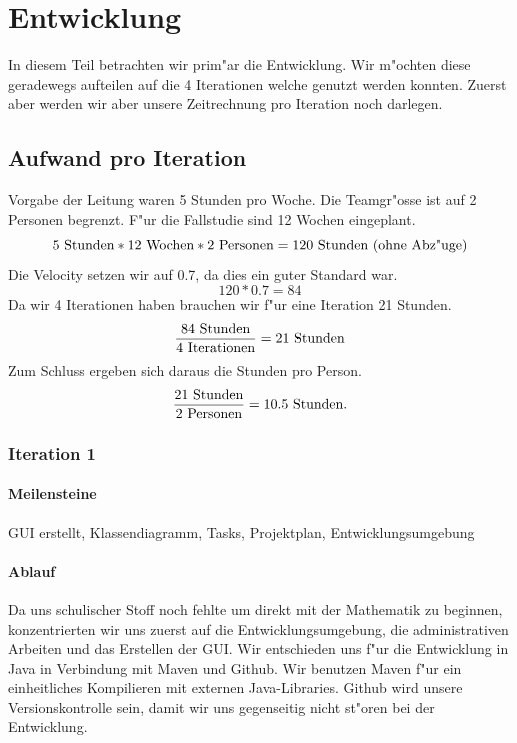 \documentclass[11pt]{report}
\begin{document}
\newpage

\chapter{Entwicklung}
In diesem Teil betrachten wir prim"ar die Entwicklung. Wir m"ochten diese geradewegs aufteilen auf die 4 Iterationen welche genutzt werden konnten. Zuerst aber werden wir aber unsere Zeitrechnung pro Iteration noch darlegen.
\section{Aufwand pro Iteration}
Vorgabe der Leitung waren 5 Stunden pro Woche. Die Teamgr"osse ist auf 2 Personen begrenzt. F"ur die Fallstudie sind 12 Wochen eingeplant.
\begin{equation}
5\textnormal{ Stunden} * 12\textnormal{ Wochen} * 2\textnormal{ Personen} = 120\textnormal{ Stunden (ohne Abz"uge)}
\end{equation}
Die Velocity setzen wir auf 0.7, da dies ein guter Standard war.
\begin{equation}
120 * 0.7 = 84
\end{equation}
Da wir 4 Iterationen haben brauchen wir f"ur eine Iteration 21 Stunden.
\begin{equation}
\frac{84\textnormal{ Stunden}}{4\textnormal{ Iterationen}} = 21\textnormal{ Stunden}
\end{equation}
Zum Schluss ergeben sich daraus die Stunden pro Person.
\begin{equation}
\frac{21\textnormal{ Stunden}}{2\textnormal{ Personen}} = 10.5\textnormal{ Stunden.}
\end{equation}
\newpage
\subsection{Iteration 1}
\subsubsection{Meilensteine}
GUI erstellt,  Klassendiagramm,  Tasks,  Projektplan, Entwicklungsumgebung
\subsubsection{Ablauf}
Da uns schulischer Stoff noch fehlte um direkt mit der Mathematik zu beginnen, konzentrierten wir uns zuerst auf die Entwicklungsumgebung, die administrativen Arbeiten und das Erstellen der GUI. Wir entschieden uns f"ur die Entwicklung in Java in Verbindung mit Maven und Github. Wir benutzen Maven f"ur ein einheitliches Kompilieren mit externen Java-Libraries. Github wird unsere Versionskontrolle sein, damit wir uns gegenseitig nicht st"oren bei der Entwicklung.
\linebreak
\end{document}
